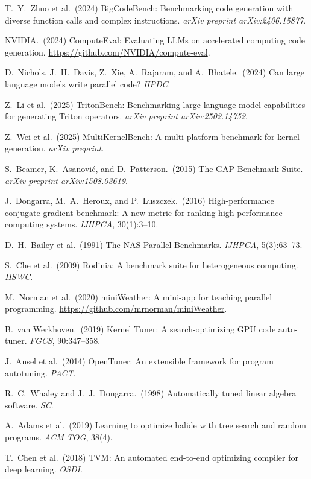 \documentclass{article}
\begin{document}
{
T.\ Y.\ Zhuo et al.\ (2024) BigCodeBench: Benchmarking code generation with
diverse function calls and complex instructions.
{\it arXiv preprint arXiv:2406.15877}.

NVIDIA.\ (2024) ComputeEval: Evaluating LLMs on accelerated computing code
generation. \url{https://github.com/NVIDIA/compute-eval}.

D.\ Nichols, J.\ H.\ Davis, Z.\ Xie, A.\ Rajaram, and A.\ Bhatele.\ (2024)
Can large language models write parallel code?
{\it HPDC}.

Z.\ Li et al.\ (2025) TritonBench: Benchmarking large language model
capabilities for generating Triton operators.
{\it arXiv preprint arXiv:2502.14752}.

Z.\ Wei et al.\ (2025) MultiKernelBench: A multi-platform benchmark for
kernel generation.
{\it arXiv preprint}.

S.\ Beamer, K.\ Asanovi\'c, and D.\ Patterson.\ (2015) The GAP Benchmark Suite.
{\it arXiv preprint arXiv:1508.03619}.

J.\ Dongarra, M.\ A.\ Heroux, and P.\ Luszczek.\ (2016) High-performance conjugate-gradient
benchmark: A new metric for ranking high-performance computing systems.
{\it IJHPCA}, 30(1):3--10.

D.\ H.\ Bailey et al.\ (1991) The NAS Parallel Benchmarks.
{\it IJHPCA}, 5(3):63--73.

S.\ Che et al.\ (2009) Rodinia: A benchmark suite for heterogeneous computing.
{\it IISWC}.

M.\ Norman et al.\ (2020) miniWeather: A mini-app for teaching parallel programming.
\url{https://github.com/mrnorman/miniWeather}.

B.\ van Werkhoven.\ (2019) Kernel Tuner: A search-optimizing GPU code auto-tuner.
{\it FGCS}, 90:347--358.

J.\ Ansel et al.\ (2014) OpenTuner: An extensible framework for program autotuning.
{\it PACT}.

R.\ C.\ Whaley and J.\ J.\ Dongarra.\ (1998) Automatically tuned linear algebra software.
{\it SC}.

A.\ Adams et al.\ (2019) Learning to optimize halide with tree search and
random programs.
{\it ACM TOG}, 38(4).

T.\ Chen et al.\ (2018) TVM: An automated end-to-end optimizing compiler for
deep learning.
{\it OSDI}.
}
\end{document}
